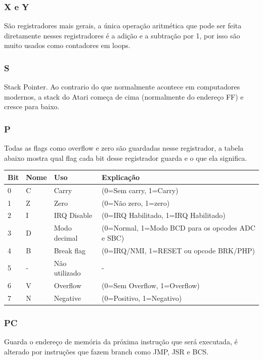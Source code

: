 \documentclass{article}
\begin{document}
\subsubsection{X e Y}
São registradores mais gerais, a única operação aritmética que pode ser feita diretamente nesses registradores é a adição e a subtração por 1, por isso são muito usados como contadores em loops.

\subsubsection{S}
Stack Pointer. Ao contrario do que normalmente acontece em computadores modernos, a stack do Atari começa de cima (normalmente do endereço FF) e cresce para baixo.

\subsubsection{P}
Todas as flags como overflow e zero são guardadas nesse registrador, a tabela abaixo mostra qual flag cada bit desse registrador guarda e o que ela significa.

\begin{center}
	\begin{tabular}{| l | l | l | l |}
	\hline
	Bit & Nome & Uso & Explicação \\ \hline
	0 & C & Carry & (0=Sem carry, 1=Carry) \\ \hline
	1 & Z & Zero & (0=Não zero, 1=zero) \\ \hline
	2 & I & IRQ Disable & (0=IRQ Habilitado, 1=IRQ Habilitado) \\ \hline
	3 & D & Modo decimal & (0=Normal, 1=Modo BCD para os opcodes ADC e SBC) \\ \hline
	4 & B & Break flag & (0=IRQ/NMI, 1=RESET ou opcode BRK/PHP)\\ \hline
	5 & - & Não utilizado & - \\ \hline
	6 & V & Overflow & (0=Sem Overflow, 1=Overflow)\\ \hline
	7 & N & Negative & (0=Positivo, 1=Negativo)\\ \hline
	\end{tabular}
\end{center}



\subsubsection{PC}
Guarda o endereço de memória da próxima instrução que será executada, é alterado por instruções que fazem branch como JMP, JSR e BCS.
\end{document}

